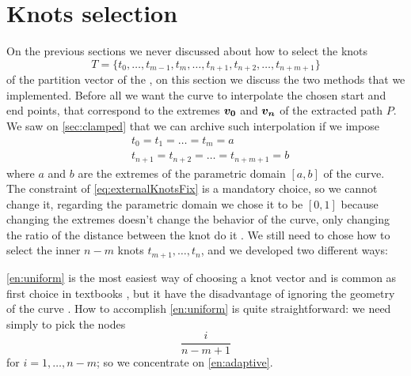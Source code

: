\documentclass[dissertation.tex]{subfiles}
\begin{document}
\section{Knots selection}\label{sec:knotSel}
On the previous sections we never discussed about how to select the
knots 
\begin{equation*}
  T=\{t_0,\dots,t_{m-1},t_{m},\dots,t_{n+1},t_{n+2},\dots,t_{n+m+1}\}
\end{equation*}
of the partition vector of the \bs, on this section we discuss the two
methods that we implemented. Before all we want
the curve to interpolate 
the chosen start and end points, that correspond to the extremes
$\boldsymbol{v_0}$ and $\boldsymbol{v_n}$ of the extracted path $P$. We saw on
\cref{sec:clamped} that we can archive such interpolation if we impose
\begin{equation}\label{eq:externalKnotsFix}
  \begin{split}
    &t_0 = t_1 = \dots = t_{m} = a\\
    &t_{n+1} = t_{n+2} = \dots = t_{n+m+1} = b
  \end{split}
\end{equation}
where $a$ and $b$ are the extremes of the parametric domain $[a,b]$ of
the curve. The constraint of \cref{eq:externalKnotsFix} is a mandatory
choice, so we cannot change it, regarding the parametric domain we
chose it to be $[0,1]$ because changing the extremes doesn't change
the behavior of the curve, only changing the ratio of the distance
between the knot do it \cite{farin}. We still need to chose how to select 
the inner $n-m$ knots $t_{m+1},\dots,t_n$, and we developed two different
ways:

\cref{en:uniform} is the most easiest way of choosing a knot vector
and is common as first choice in textbooks \cite{farin}\cite{docarmo},
but it have the disadvantage of ignoring the geometry of the curve
\cite{farin}. How to accomplish \cref{en:uniform} is quite
straightforward: we need simply to pick the nodes
\begin{equation*}
  \frac{i}{n-m+1}
\end{equation*}
for $i=1,\dots,n-m$; so we concentrate on \cref{en:adaptive}.
\end{document}
